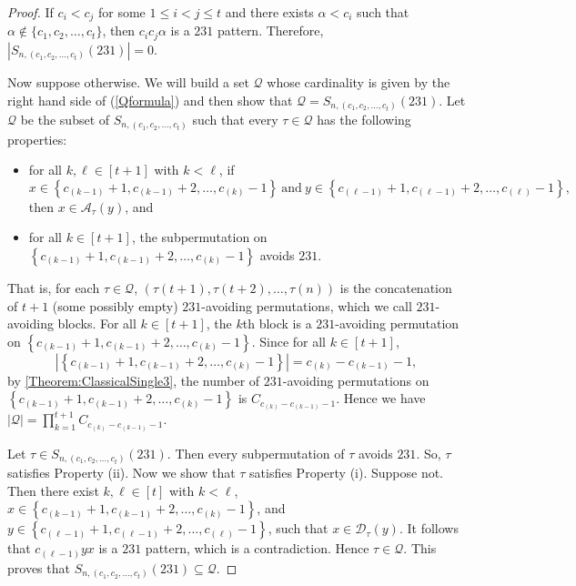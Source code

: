 \documentclass[11pt]{article}
\theoremstyle{definition}
\numberwithin{equation}{section}
\begin{document}
\begin{proof}
    If $c_i<c_j$ for some $1\leq i<j\leq t$ and there exists $\alpha<c_i$ such that $\alpha\notin\{c_1,c_2,\ldots,c_t\}$, then $c_ic_j\alpha$ is a $231$ pattern. Therefore, $|S_{n,(c_1,c_2,\ldots,c_t)}(231)|=0$.

    Now suppose otherwise. We will build a set $\mathcal{Q}$ 
whose cardinality is given by the right hand side of (\ref{Qformula}) 
and then show that $\mathcal{Q}=S_{n,(c_1,c_2,\ldots,c_t)}(231)$. Let $\mathcal{Q}$ be the subset of $S_{n,(c_1,c_2,\ldots,c_t)}$ such that every $\tau\in\mathcal{Q}$ has the following properties:
\begin{itemize}
    \item[(i)] for all $k,\ell\in[t+1]$ with $k<\ell$, if \[x\in\left\{c_{(k-1)}+1,c_{(k-1)}+2,\ldots,c_{(k)}-1\right\}~\text{and}~y\in\left\{c_{(\ell-1)}+1,c_{(\ell-1)}+2,\ldots,c_{(\ell)}-1\right\},\] then $x\in\mathcal{A}_\tau(y)$, and
    \item[(ii)] for all $k\in[t+1]$, the subpermutation on $\left\{c_{(k-1)}+1,c_{(k-1)}+2,\ldots,c_{(k)}-1\right\}$ avoids $231$.
\end{itemize}
That is, for each $\tau\in\mathcal{Q}$, $(\tau(t+1),\tau(t+2),\ldots,\tau(n))$ is the concatenation of $t+1$ (some possibly empty) $231$-avoiding permutations, which we call $231$-avoiding blocks. 
For all $k\in[t+1]$, the $k$th block is a $231$-avoiding permutation on $\left\{c_{(k-1)}+1,c_{(k-1)}+2,\ldots,c_{(k)}-1\right\}$. 
Since for all $k\in[t+1]$,  \[\left|\left\{c_{(k-1)}+1,c_{(k-1)}+2,\ldots,c_{(k)}-1\right\}\right|=c_{(k)}-c_{(k-1)}-1,\] by \cref{Theorem:ClassicalSingle3}, the number of $231$-avoiding permutations on $\left\{c_{(k-1)}+1,c_{(k-1)}+2,\ldots,c_{(k)}-1\right\}$ is $C_{c_{(k)}-c_{(k-1)}-1}$. Hence we have $|\mathcal{Q}|=\prod_{k=1}^{t+1}C_{c_{(k)}-c_{(k-1)}-1}$.

Let $\tau\in S_{n,(c_1,c_2,\ldots,c_t)}(231)$. Then every subpermutation of $\tau$ avoids $231$. So, $\tau$ satisfies Property (ii). Now we show that $\tau$ satisfies Property (i). Suppose not. Then there exist $k,\ell\in[t]$ with $k<\ell$, $x\in\left\{c_{(k-1)}+1,c_{(k-1)}+2,\ldots,c_{(k)}-1\right\}$, and $y\in\left\{c_{(\ell-1)}+1,c_{(\ell-1)}+2,\ldots,c_{(\ell)}-1\right\}$, such that $x\in\mathcal{D}_\tau(y)$. It follows that $c_{(\ell-1)}yx$ is a $231$ 
pattern, which is a contradiction. Hence $\tau\in \mathcal{Q}$. This proves that $S_{n,(c_1,c_2,\ldots,c_t)}(231)\subseteq\mathcal{Q}$.


\end{proof}
\end{document}
